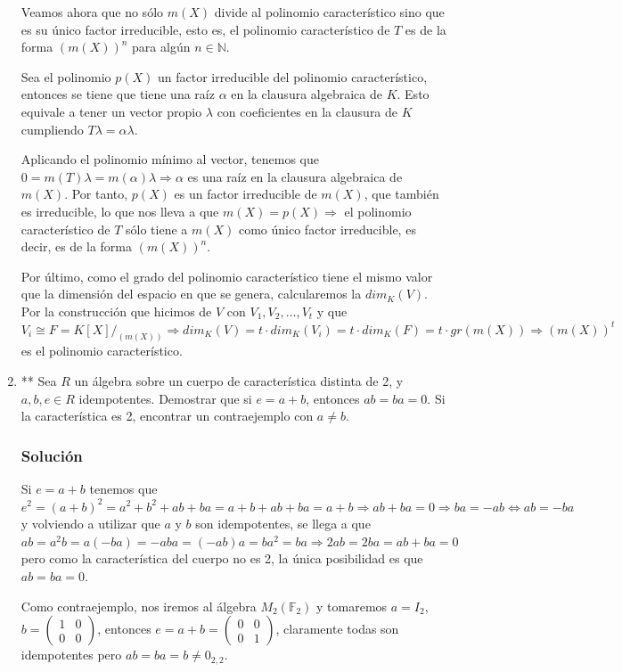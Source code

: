 \documentclass[paper=a4, fontsize=11pt, spanish]{scrartcl}
\begin{document}
\begin{enumerate}
		Veamos ahora que no sólo $m(X)$ divide al polinomio característico sino que es su único factor
		irreducible, esto es, el polinomio característico de $T$ es de la forma $(m(X))^n$ para algún $n \in
		\mathbb{N}$.
		
		Sea el polinomio $p(X)$ un factor irreducible del polinomio característico, entonces se tiene que
		tiene una raíz $\alpha$ en la clausura algebraica de $K$. Esto equivale a tener un vector propio
		$\lambda$ con coeficientes en la clausura de $K$ cumpliendo $T\lambda = \alpha\lambda$.
		
		Aplicando el polinomio mínimo al vector, tenemos que $0 = m(T)\lambda = m(\alpha)\lambda \Rightarrow
		\alpha$ es una raíz en la clausura algebraica de $m(X)$. Por tanto, $p(X)$ es un factor irreducible
		de $m(X)$, que también es irreducible, lo que nos lleva a que $m(X) = p(X) \Rightarrow$ el polinomio
		característico de $T$ sólo tiene a $m(X)$ como único factor irreducible, es decir, es de la forma
		$(m(X))^n$.
		
		Por último, como el grado del polinomio característico tiene el mismo valor que la dimensión del
		espacio en que se genera, calcularemos la $dim_K(V)$. Por la construcción que hicimos de $V$ con
		$V_1, V_2, \dots, V_t$ y que $V_i \cong F = K[X]/_{(m(X))} \Rightarrow dim_K(V) = t \cdot dim_K (V_i)
		= t \cdot dim_K(F) = t \cdot gr(m(X)) \Rightarrow (m(X))^t$ es el polinomio característico.
		
		\item ** Sea $R$ un álgebra sobre un cuerpo de característica distinta de 2, y $a, b, e \in R$ idempotentes.
		Demostrar que si $e = a + b$, entonces $ab = ba = 0$. Si la característica es 2, encontrar un contraejemplo
		con $a \neq b$.
		\subsubsection*{Solución}
		Si $e = a+b$ tenemos que $e^2 = (a+b)^2 = a^2 + b^2 + ab + ba = a + b + ab + ba = a+b \Rightarrow ab + ba
		= 0 \Rightarrow ba = -ab \Leftrightarrow ab = -ba$ y volviendo a utilizar que $a$ y $b$ son idempotentes,
		se llega a que $ab = a^2b = a(-ba) = -aba = (-ab)a = ba^2 = ba \Rightarrow 2ab = 2ba = ab + ba = 0$ pero
		como la característica del cuerpo no es 2, la única posibilidad es que $ab = ba = 0$.
		
		Como contraejemplo, nos iremos al álgebra $M_2(\mathbb{F}_2)$ y tomaremos $a = I_2$, $\displaystyle b =
		\begin{pmatrix} 1 & 0 \\ 0 & 0 \end{pmatrix}$, entonces $\displaystyle e = a+b = \begin{pmatrix} 0 & 0
		\\ 0 & 1 \end{pmatrix}$, claramente todas son idempotentes pero $ab = ba = b \neq 0_{2,2}$.
	

\end{enumerate}
\end{document}
